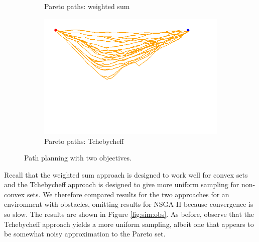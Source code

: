 \documentclass{article}
\begin{document}
\begin{figure}[h!]
\begin{subfigure}[b]{0.31\linewidth}
		\caption{Pareto paths: weighted sum}
		\label{fig:sim:norm:sols:b}
	\end{subfigure} 
	\begin{subfigure}[b]{0.35\linewidth}
		\centering
		\includegraphics[width=\textwidth]{fig/sim2-2obj/MORRTstar00-ALL.png}
		\caption{Pareto paths: Tchebycheff}
		\label{fig:sim:norm:sols:c}
	\end{subfigure}
	\caption{Path planning with two objectives.}
	\label{fig:sim:norm}
\end{figure}

Recall that the weighted sum approach is designed to work well for convex sets and the Tchebycheff approach is designed to give more uniform sampling for non-convex sets. 
We therefore compared results for the two approaches for an environment with obstacles, omitting results for NSGA-II because convergence is so slow.  
The results are shown in Figure \ref{fig:sim:obs}.
As before, observe that the Tchebycheff approach yields a more uniform sampling, albeit one that appears to be somewhat noisy approximation to the Pareto set.
\end{document}
